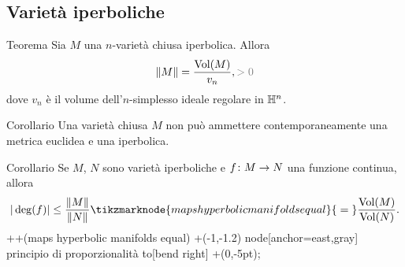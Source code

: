 \documentclass{beamer}
\begin{document}
\subsection{Varietà iperboliche}
\begin{frame}{\secname}{\subsecname}
\begin{block}{Teorema}
Sia $M$ una $n$-varietà chiusa iperbolica. Allora
\[
\norm{M}=\frac{\Vol(M)}{v_n},{\color{gray}>0}
\]
dove $v_n$ è il volume dell'$n$-simplesso ideale regolare in $\mathbb{H}^n$.
\end{block}
\end{frame}
\begin{frame}{\secname}{\subsecname}
\begin{block}{Corollario}
Una varietà chiusa $M$ non può ammettere contemporaneamente una metrica euclidea e una iperbolica.
\end{block}
\begin{block}{Corollario}
Se $M$, $N$ sono varietà iperboliche e $\map{f}{M}{N}$ una funzione continua, allora
\[
|\deg(f)|\le\frac{\norm{M}}{\norm{N}}\tikzmarknode{maps hyperbolic manifolds equal}{{}={}}\frac{\Vol(M)}{\Vol(N)}.
\]
 ++(maps hyperbolic manifolds equal) +(-1,-1.2) node[anchor=east,gray] {principio di proporzionalità} to[bend right] +(0,-5pt);
\end{block}
\end{frame}
\end{document}
